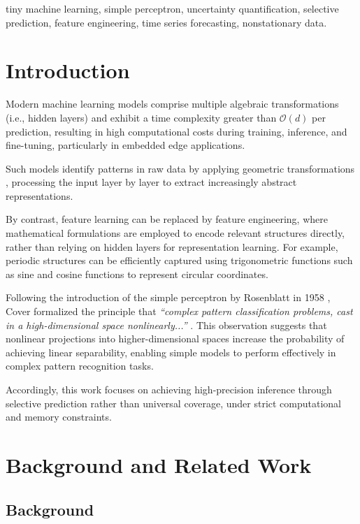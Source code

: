 \documentclass[conference]{IEEEtran}
\begin{document}
\begin{IEEEkeywords}
tiny machine learning, simple perceptron, uncertainty quantification, selective prediction, feature engineering, time series forecasting, nonstationary data.
\end{IEEEkeywords}

\section{Introduction}

Modern machine learning models comprise multiple algebraic transformations (i.e., hidden layers) \cite{b5} and exhibit a time complexity greater than $\mathcal{O}(d)$ per prediction, resulting in high computational costs during training, inference, and fine-tuning, particularly in embedded edge applications.

Such models identify patterns in raw data by applying geometric transformations \cite{b2}, processing the input layer by layer to extract increasingly abstract representations.

By contrast, feature learning can be replaced by feature engineering, where mathematical formulations are employed to encode relevant structures directly, rather than relying on hidden layers for representation learning. For example, periodic structures can be efficiently captured using trigonometric functions such as sine and cosine functions to represent circular coordinates.

Following the introduction of the simple perceptron by Rosenblatt in 1958 \cite{b7}, Cover formalized the principle that \textit{``complex pattern classification problems, cast in a high-dimensional space nonlinearly...''} \cite{b2}. This observation suggests that nonlinear projections into higher-dimensional spaces increase the probability of achieving linear separability, enabling simple models to perform effectively in complex pattern recognition tasks.

Accordingly, this work focuses on achieving high-precision inference through selective prediction rather than universal coverage, under strict computational and memory constraints.

\section{Background and Related Work}

\subsection{Background}
\end{document}
